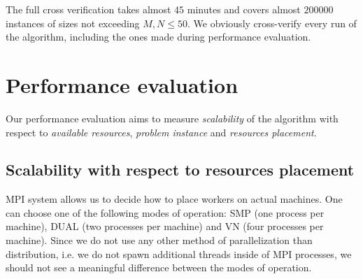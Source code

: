 The full cross verification takes almost $45$ minutes and covers almost $200000$ instances of sizes not exceeding $M, N \leq 50$.
We obviously cross-verify every run of the algorithm, including the ones made during performance evaluation.

\section*{Performance evaluation}

Our performance evaluation aims to measure \emph{scalability} of the algorithm with respect to \emph{available resources}, \emph{problem instance} and \emph{resources placement}.

\subsection*{Scalability with respect to resources placement}

MPI system allows us to decide how to place workers on actual machines.
One can choose one of the following modes of operation: SMP (one process per machine), DUAL (two processes per machine) and VN (four processes per machine).
Since we do not use any other method of parallelization than distribution, i.e. we do not spawn additional threads inside of MPI processes, we should not see a meaningful difference between the modes of operation.

